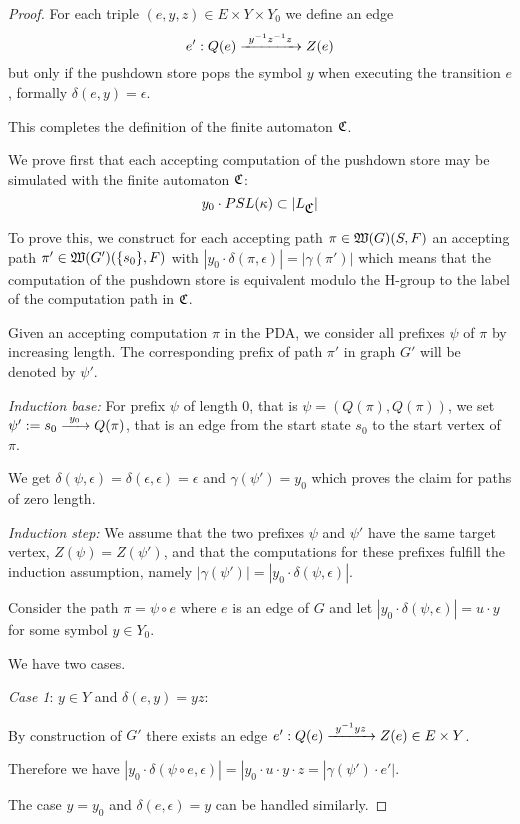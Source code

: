 \begin{proof}
For each triple $(e, y, z) \in E \times Y
\times Y_0$ we define an edge
\[ e': Q(e) \xrightarrow{\ {y^{-1} z^{-1} z}\ } Z(e) \]
but only if the pushdown store pops the symbol $y$ when executing the transition
$e$, formally $\delta(e, y) = \epsilon$.

\bigskip
This completes the definition of the finite automaton $\mbox{$\mathfrak{C}$}$.

We prove first that each accepting computation of the pushdown store may be
simulated with the finite automaton $\mbox{$\mathfrak{C}$}$:
\[ y_0 \cdot PSL(\kappa) \subset |L_{\mbox{$\mathfrak{C}$}}| \]

To prove this, we construct for each accepting path $\pi \in
\mbox{$\mathfrak{W}({G})$}(S,F)$ an accepting path $\pi' \in
\mbox{$\mathfrak{W}({G'})$}(\mbox{$\{s_0\}$}, F)$ with $|y_0 \cdot \delta(\pi, \epsilon)| = |\gamma(\pi')|$ 
which means that the computation of the pushdown store is equivalent modulo the
H-group to the label of the computation path in $\mbox{$\mathfrak{C}$}$.

Given an accepting computation $\pi$ in the PDA, we consider all prefixes
$\psi$ of $\pi$ by increasing length. The corresponding prefix of path $\pi'$ in
graph $G'$ will be denoted by $\psi'$.

{\em Induction base:} For prefix $\psi$ of length 0, that is $\psi =
(Q(\pi), Q(\pi))$, we set $\psi' := s_0 \xrightarrow{\ {y_0}\ } Q(\pi)$, that
is an edge from the start state $s_0$ to the start vertex of $\pi$. 

We get $\delta(\psi, \epsilon) = \delta(\epsilon, \epsilon) = \epsilon$ and
$\gamma(\psi') = y_0$ which proves the claim for paths of zero length.

{\em Induction step:} We assume that the two prefixes $\psi$ and $\psi'$ have
the same target vertex, $Z(\psi) = Z(\psi')$, and that the computations for
these prefixes fulfill the induction assumption, namely $|\gamma(\psi')| =
|y_0 \cdot \delta(\psi, \epsilon)|$.

Consider the path $\pi = \psi \circ e$ where $e$ is an edge of $G$ and let
$|y_0 \cdot \delta(\psi, \epsilon)| = u \cdot y$ for some symbol $y \in Y_0$.

We have two cases.

{\em Case 1}: $y \in Y$ and $\delta(e, y) = y z$:

By construction of $G'$ there exists an edge $e': Q(e) \xrightarrow{\ {y^{-1} y z}\ } Z(e)
\in E \times Y$.

Therefore we have $|y_0 \cdot \delta(\psi \circ e, \epsilon)| = |y_0 \cdot u
\cdot y \cdot z = |\gamma(\psi') \cdot e'|$.

The case $y=y_0$ and $\delta(e, \epsilon) = y$ can be handled similarly.


\end{proof}
